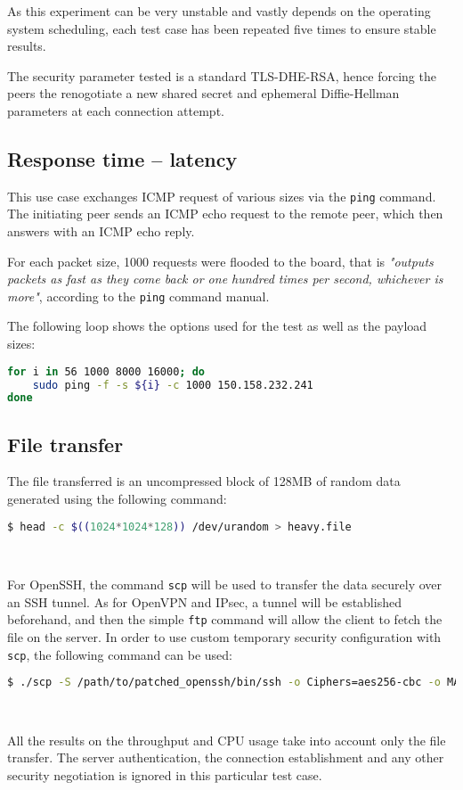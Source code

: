 As this experiment can be very unstable and vastly depends on the operating system scheduling, each test case has been repeated five times to ensure stable results.

The security parameter tested is a standard TLS-DHE-RSA, hence forcing the peers the renogotiate a new shared secret and ephemeral Diffie-Hellman parameters at each connection attempt.


\subsection{Response time -- latency}
This use case exchanges ICMP request of various sizes via the \texttt{ping} command.
The initiating peer sends an ICMP echo request to the remote peer, which then answers with an ICMP echo reply.

\noindent For each packet size, 1000 requests were flooded to the board, that is \textit{"outputs packets as fast as they come back or one hundred times per second, whichever is more"}, according to the \texttt{ping} command manual.

The following loop shows the options used for the test as well as the payload sizes:
\begin{lstlisting}[language=bash]
for i in 56 1000 8000 16000; do
	sudo ping -f -s ${i} -c 1000 150.158.232.241
done
\end{lstlisting}

\subsection{File transfer}
The file transferred is an uncompressed block of 128MB of random data generated using the following command:
\begin{lstlisting}[language=bash]
  $ head -c $((1024*1024*128)) /dev/urandom > heavy.file
\end{lstlisting}~\newline{}

For OpenSSH, the command \texttt{scp} will be used to transfer the data securely over an SSH tunnel.
As for OpenVPN and IPsec, a tunnel will be established beforehand, and then the simple \texttt{ftp} command will allow the client to fetch the file on the server.
In order to use custom temporary security configuration with \texttt{scp}, the following command can be used:
\begin{lstlisting}[language=bash]
  $ ./scp -S /path/to/patched_openssh/bin/ssh -o Ciphers=aes256-cbc -o MACs=none@barco.com root@150.158.232.241:heavy.file .
\end{lstlisting}~\newline{}


All the results on the throughput and CPU usage take into account only the file transfer.
The server authentication, the connection establishment and any other security negotiation is ignored in this particular test case.